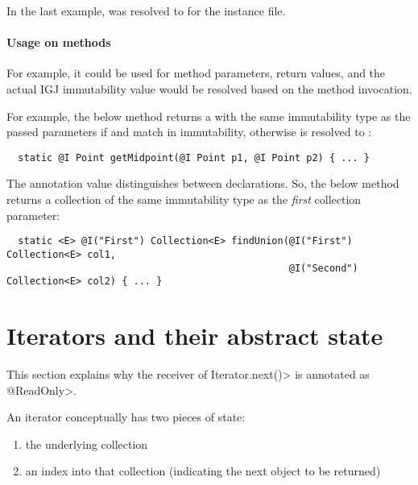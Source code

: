 In the last example,  was resolved to  for the instance file.

\paragraph{Usage on methods\label{igj-usage-on-methods}}

For example, it could be used for method parameters, return values, and the
actual IGJ immutability value would be resolved based on the method invocation.

For example, the below method  returns a  with the same
immutability type as the passed parameters if  and  match
in immutability, otherwise  is resolved to :

\begin{Verbatim}
  static @I Point getMidpoint(@I Point p1, @I Point p2) { ... }
\end{Verbatim}

The  annotation value distinguishes between 
declarations.  So, the below method  returns a collection of the same
immutability type as the \emph{first} collection parameter:

\begin{Verbatim}
  static <E> @I("First") Collection<E> findUnion(@I("First") Collection<E> col1,
                                                 @I("Second") Collection<E> col2) { ... }
\end{Verbatim}


\section{Iterators and their abstract state\label{igj-library-annotations}}

This section explains why the receiver of \<Iterator.next()> is annotated
as \<@ReadOnly>.

An iterator conceptually has two pieces of state:
\begin{enumerate}
\item
  the underlying collection
\item
  an index into that collection (indicating the next object to be returned)
\end{enumerate}

